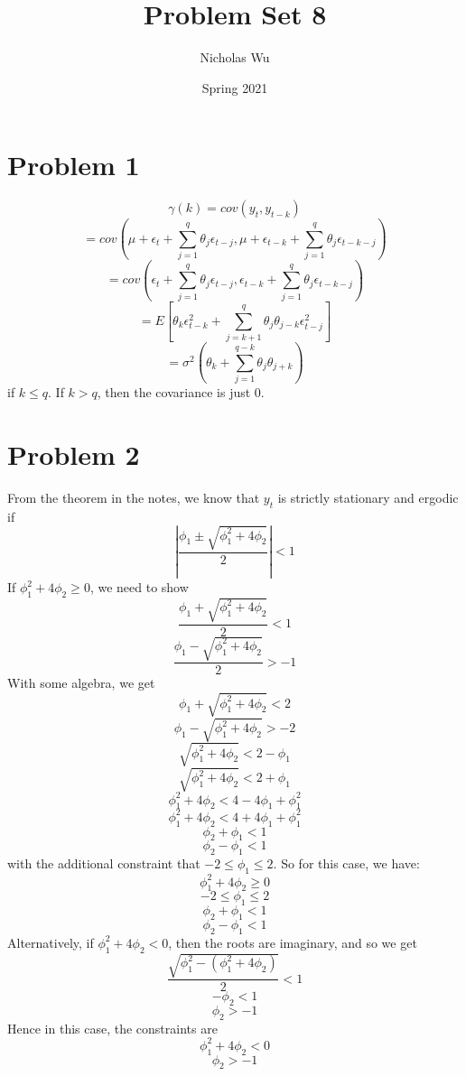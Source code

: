 \documentclass[10pt,letter]{article}
\begin{document}


\title{Problem Set 8}

\author{Nicholas Wu}

\date{Spring 2021}

\maketitle


\section*{Problem 1}
\[ \gamma(k) = cov(y_t, y_{t-k}) \]
\[ = cov\left(\mu + \epsilon_t + \sum_{j=1}^q \theta_j \epsilon_{t - j}, \mu + \epsilon_{t-k} + \sum_{j=1}^q \theta_j \epsilon_{t - k - j} \right) \]
\[ = cov\left(\epsilon_t + \sum_{j=1}^q \theta_j \epsilon_{t - j}, \epsilon_{t-k} + \sum_{j=1}^q \theta_j \epsilon_{t - k - j} \right) \]
\[ = E\left[\theta_k \epsilon_{t-k}^2 + \sum_{j=k+1}^q \theta_j \theta_{j-k} \epsilon_{t-j}^2 \right] \]
\[ = \sigma^2 \left( \theta_k + \sum_{j=1}^{q-k} \theta_j \theta_{j+k} \right) \]
if $ k \le q$. If $k > q$, then the covariance is just 0.
\section*{Problem 2}
From the theorem in the notes, we know that $y_t$ is strictly stationary and ergodic if
\[ \left| \frac{\phi_1 \pm \sqrt{\phi_1^2 + 4\phi_2}}{2} \right| < 1 \]
If $\phi_1^2 + 4\phi_2 \ge 0$, we need to show
\[ \frac{\phi_1 + \sqrt{\phi_1^2 + 4\phi_2}}{2}  < 1 \]
\[ \frac{\phi_1 - \sqrt{\phi_1^2 + 4\phi_2}}{2}  > -1 \]
With some algebra, we get
\[ \phi_1 + \sqrt{\phi_1^2 + 4\phi_2}  < 2 \]
\[ \phi_1 - \sqrt{\phi_1^2 + 4\phi_2}  > -2 \]
\[ \sqrt{\phi_1^2 + 4\phi_2}  < 2 - \phi_1 \]
\[ \sqrt{\phi_1^2 + 4\phi_2}  < 2 + \phi_1 \]
\[ \phi_1^2 + 4\phi_2  < 4 - 4\phi_1 + \phi_1^2 \]
\[ \phi_1^2 + 4\phi_2  < 4 + 4\phi_1 + \phi_1^2 \]
\[ \phi_2 + \phi_1 < 1 \]
\[ \phi_2 - \phi_1  < 1  \]
with the additional constraint that $-2 \le \phi_1 \le 2$. So for this case, we have:
\[ \phi_1^2 + 4\phi_2 \ge 0 \]
\[ -2 \le \phi_1 \le 2 \]
\[ \phi_2 + \phi_1 < 1 \]
\[ \phi_2 - \phi_1  < 1  \]
Alternatively, if $\phi_1^2 + 4\phi_2 < 0 $, then the roots are imaginary, and so we get
\[ \frac{\sqrt{\phi_1^2 - (\phi_1^2 + 4\phi_2)}}{2} < 1 \]
\[ -\phi_2 < 1 \]
\[ \phi_2 > -1 \]
Hence in this case, the constraints are
\[ \phi_1^2 + 4\phi_2 < 0 \]
\[ \phi_2 > -1 \]
\end{document}
